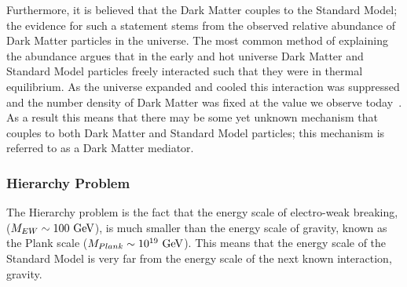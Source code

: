 Furthermore, it is believed that the Dark Matter couples to the Standard Model;
the evidence for such a statement stems from the observed relative abundance of Dark Matter particles in the universe.
The most common method of explaining the abundance
argues that in the early and hot universe Dark Matter and Standard Model particles
freely interacted such that they were in thermal equilibrium.
As the universe expanded and cooled this interaction was suppressed
and the number density of Dark Matter was fixed at the value we observe today~\cite{theo-bsm_dm_feng}.
As a result this means that there may be some yet unknown mechanism that couples to both Dark Matter and
Standard Model particles; this mechanism is referred to as a Dark Matter mediator.

\subsubsection{Hierarchy Problem}

The Hierarchy problem is the fact that the energy scale of electro-weak breaking, ($M_{EW}\nobreak\sim\nobreak100~\text{GeV}$),
is much smaller than the energy scale of gravity,
known as the Plank scale ($M_{Plank}\nobreak\sim\nobreak10^{19}~\text{GeV}$).
This means that the energy scale of the Standard Model is very far
from the energy scale of the next known interaction, gravity.

